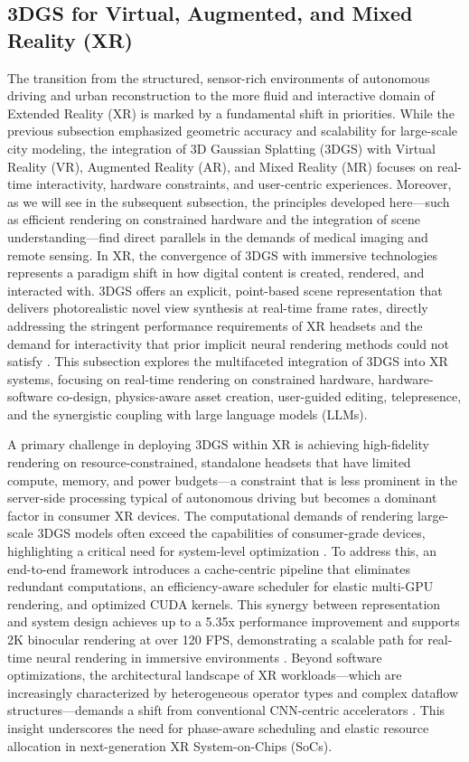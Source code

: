 \documentclass[11pt]{article}
\begin{document}
\subsection{3DGS for Virtual, Augmented, and Mixed Reality (XR)}

The transition from the structured, sensor-rich environments of autonomous driving and urban reconstruction to the more fluid and interactive domain of Extended Reality (XR) is marked by a fundamental shift in priorities. While the previous subsection emphasized geometric accuracy and scalability for large-scale city modeling, the integration of 3D Gaussian Splatting (3DGS) with Virtual Reality (VR), Augmented Reality (AR), and Mixed Reality (MR) focuses on real-time interactivity, hardware constraints, and user-centric experiences. Moreover, as we will see in the subsequent subsection, the principles developed here---such as efficient rendering on constrained hardware and the integration of scene understanding---find direct parallels in the demands of medical imaging and remote sensing. In XR, the convergence of 3DGS with immersive technologies represents a paradigm shift in how digital content is created, rendered, and interacted with. 3DGS offers an explicit, point-based scene representation that delivers photorealistic novel view synthesis at real-time frame rates, directly addressing the stringent performance requirements of XR headsets and the demand for interactivity that prior implicit neural rendering methods could not satisfy \cite{ref675}. This subsection explores the multifaceted integration of 3DGS into XR systems, focusing on real-time rendering on constrained hardware, hardware-software co-design, physics-aware asset creation, user-guided editing, telepresence, and the synergistic coupling with large language models (LLMs).

A primary challenge in deploying 3DGS within XR is achieving high-fidelity rendering on resource-constrained, standalone headsets that have limited compute, memory, and power budgets---a constraint that is less prominent in the server-side processing typical of autonomous driving but becomes a dominant factor in consumer XR devices. The computational demands of rendering large-scale 3DGS models often exceed the capabilities of consumer-grade devices, highlighting a critical need for system-level optimization \cite{ref676}. To address this, an end-to-end framework introduces a cache-centric pipeline that eliminates redundant computations, an efficiency-aware scheduler for elastic multi-GPU rendering, and optimized CUDA kernels. This synergy between representation and system design achieves up to a 5.35x performance improvement and supports 2K binocular rendering at over 120 FPS, demonstrating a scalable path for real-time neural rendering in immersive environments \cite{ref676}. Beyond software optimizations, the architectural landscape of XR workloads---which are increasingly characterized by heterogeneous operator types and complex dataflow structures---demands a shift from conventional CNN-centric accelerators \cite{ref677}. This insight underscores the need for phase-aware scheduling and elastic resource allocation in next-generation XR System-on-Chips (SoCs).
\end{document}
